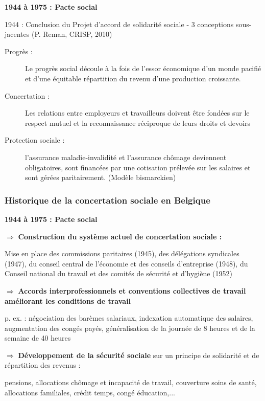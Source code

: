 \documentclass[12pt]{beamer}
\begin{document}
  \begin{frame}
    \begin{center} \textbf{1944 à 1975 : Pacte social} \end{center}
    
    1944 : Conclusion du Projet d'accord de solidarité sociale - 3 conceptions sous-jacentes (P. Reman, CRISP, 2010)
    
    \begin{description}
     \item[Progrès : ] \og{} Le progrès social découle à la fois de l'essor économique d'un monde pacifié et d'une équitable répartition du revenu d'une production croissante. \fg{}
     \item[Concertation : ] \og{} Les relations entre employeurs et travailleurs doivent être fondées sur le respect mutuel et la reconnaissance réciproque de leurs droits et devoirs \fg{}
     \item[Protection sociale : ] \og{} l'assurance maladie-invalidité et l'assurance chômage deviennent obligatoires, sont financées par une cotisation prélevée sur les salaires et sont gérées paritairement. \fg{} (Modèle bismarckien)
    \end{description}
  \end{frame}
  
  \begin{frame}
    \frametitle{Historique de la concertation sociale en Belgique}
    \begin{center} \textbf{1944 à 1975 : Pacte social} \end{center}
    
    $\Rightarrow$ \textbf{Construction du système actuel de concertation sociale :}
    
    Mise en place des commissions paritaires (1945), des délégations syndicales (1947), du conseil central de l'économie et des conseils d'entreprise (1948), du Conseil national du travail et des comités de sécurité et d'hygiène (1952)
    
    $\Rightarrow$ \textbf{Accords interprofessionnels et conventions collectives de travail améliorant les conditions de travail}
    
    p. ex. : négociation des barèmes salariaux, indexation automatique des salaires, augmentation des congés payés, généralisation de la journée de 8 heures et de la semaine de 40 heures
    
    $\Rightarrow$ \textbf{Développement de la sécurité sociale} sur un principe de solidarité et de répartition des revenus :
    
    pensions, allocations chômage et incapacité de travail, couverture soins de santé, allocations familiales, crédit temps, congé éducation,...
    
  \end{frame}
  
\end{document}
